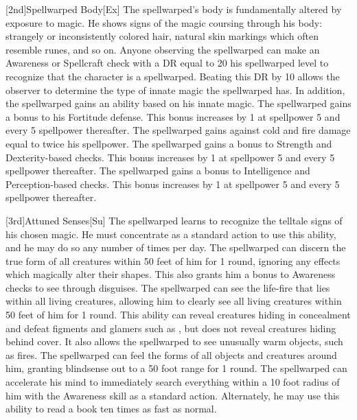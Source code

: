 [2nd]{Spellwarped Body}[Ex]
The spellwarped's body is fundamentally altered by exposure to magic.
He shows signs of the magic coursing through his body: strangely or inconsistently colored hair, natural skin markings which often resemble runes, and so on.
Anyone observing the spellwarped can make an Awareness or Spellcraft check with a DR equal to 20 \sub his spellwarped level to recognize that the character is a spellwarped.
Beating this DR by 10 allows the observer to determine the type of innate magic the spellwarped has.
In addition, the spellwarped gains an ability based on his innate magic.
    The spellwarped gains a  bonus to his Fortitude defense.
    This bonus increases by 1 at spellpower 5 and every 5 spellpower thereafter.
    The spellwarped gains  against cold and fire damage equal to twice his spellpower.
    The spellwarped gains a  bonus to Strength and Dexterity-based checks.
    This bonus increases by 1 at spellpower 5 and every 5 spellpower thereafter.
    The spellwarped gains a  bonus to Intelligence and Perception-based checks.
    This bonus increases by 1 at spellpower 5 and every 5 spellpower thereafter.

[3rd]{Attuned Senses}[Su]
The spellwarped learns to recognize the telltale signs of his chosen magic.
He must concentrate as a standard action to use this ability, and he may do so any number of times per day.
    The spellwarped can discern the true form of all creatures within 50 feet of him for 1 round, ignoring any effects which magically alter their shapes.
    This also grants him a  bonus to Awareness checks to see through disguises.
    The spellwarped can see the life-fire that lies within all living creatures, allowing him to clearly see all living creatures within 50 feet of him for 1 round.
    This ability can reveal creatures hiding in concealment and defeat figments and glamers such as , but does not reveal creatures hiding behind cover.
    It also allows the spellwarped to see unusually warm objects, such as fires.
    The spellwarped can feel the forms of all objects and creatures around him, granting blindsense out to a 50 foot range for 1 round.
    The spellwarped can accelerate his mind to immediately search everything within a 10 foot radius of him with the Awareness skill as a standard action.
    Alternately, he may use this ability to read a book ten times as fast as normal.

